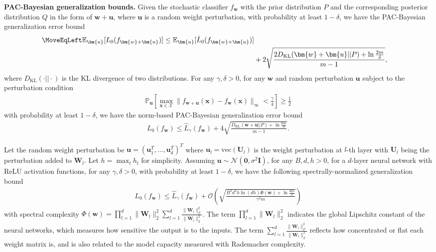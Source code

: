 \documentclass[journal]{IEEEtran} %
\newcommand{\nn}{\nonumber}
\def\vzero{{\bm{0}}}
\def\vu{{\bm{u}}}
\def\vw{{\bm{w}}}
\def\vx{{\bm{x}}}
\def\mI{{\bm{I}}}
\def\mU{{\bm{U}}}
\def\mW{{\bm{W}}}
\def\gX{{\mathcal{X}}}
\newcommand{\E}{\mathbb{E}}
\newcommand{\KL}{D_{\mathrm{KL}}}
\begin{document}
\textbf{PAC-Bayesian generalization bounds.}  Given the stochastic classifier $f_{\vw}$ with the prior distribution $P$ and the corresponding posterior distribution $Q$ in the form of $\vw+\vu$, where $\vu$ is a random weight perturbation,
with probability at least $1-\delta$, we have the PAC-Bayesian generalization error bound \cite{mcallester2003simplified}
\begin{align}
    \MoveEqLeft \E_{\vu} [L_0(f_{\vw+\vu})] \le \E_{\vu} [\hat{L}_0(f_{\vw+\vu})] \nn \\
    &+ 2 \sqrt{\frac{2 \KL(\vw+\vu || P) + \ln \frac{2m}{\delta}}{m-1}},
\end{align}
where $\KL(\cdot || \cdot)$ is the KL divergence of two distributions.
For any $\gamma,\delta > 0$, for any $\vw$ and random perturbation $\vu$ subject to the perturbation condition
\begin{align} \label{eq:pert-condition}
    \mathbb{P}_{\vu} [\max_{\vx \in \gX} \|f_{\vw+\vu}(\vx)-f_{\vw}(\vx)\|_{\infty} < \frac{\gamma}{4} ] \ge \frac{1}{2}
\end{align}
with probability at least $1-\delta$, we have the norm-based PAC-Bayesian generalization error bound \cite{mcallester2003simplified,langford2002pac}
\begin{align}
    L_0(f_{\vw}) \le \hat{L}_{\gamma}(f_{\vw}) + 4 \sqrt{\frac{\KL(\vw+\vu || P) + \ln \frac{6m}{\delta}}{m-1}}.
\end{align}

Let the random weight perturbation be $\vu=(\vu_1^T,\dots,\vu_d^T)^T$ where $\vu_l=\mathrm{vec}(\mU_l)$ is the weight perturbation at $l$-th layer with $\mU_l$ being the perturbation added to $\mW_l$.
Let $h = \max_l h_l$ for simplicity.
Assuming $\vu \sim \mathcal{N}(\vzero,\sigma^2 \mI)$, for any $B, d, h > 0$, for a $d$-layer neural network with ReLU activation functions, for any $\gamma, \delta > 0$, with probability at least $1-\delta$, we have the following spectrally-normalized generalization bound \cite{neyshabur2018pac}
\begin{align} \label{eq:gen-bound-origin}
    L_0(f_{\vw}) \le \hat{L}_{\gamma}(f_{\vw}) + \mathcal{O} \left( \sqrt{ \frac{B^2 d^2 h \ln(dh) \Phi(\vw) + \ln \frac{dm}{\delta}}{\gamma^2 m}} \right)
\end{align}
with spectral complexity $\Phi(\vw)=\prod_{l=1}^d \|\mW_l\|_2^2 \sum_{l=1}^d \frac{\|\mW_l\|_F^2}{\|\mW_l\|_2^2}$. The term $\prod_{l=1}^d \|\mW_l\|_2^2$ indicates the global Lipschitz constant of the neural networks, which measures how sensitive the output is to the inputs. The term $\sum_{l=1}^d \frac{\|\mW_l\|_F^2}{\|\mW_l\|_2^2}$ reflects how concentrated or flat each weight matrix is, and is also related to the model capacity measured with Rademacher complexity.
\end{document}
